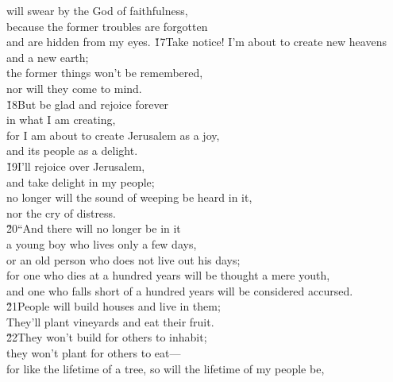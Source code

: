\begin{poetry}
\poemlll       will swear by the God of faithfulness, \\
\poeml because the former troubles are forgotten \\
\poemll    and are hidden from my eyes.
\poeml \v{17}Take notice! I'm about to create new heavens \\
\poemll    and a new earth; \\
\poeml the former things won't be remembered, \\
\poemll    nor will they come to mind. \\
\poeml \v{18}But be glad and rejoice forever \\
\poemll    in what I am creating, \\
\poeml for I am about to create Jerusalem as a joy, \\
\poemll    and its people as a delight. \\
\poeml \v{19}I'll rejoice over Jerusalem, \\
\poemll    and take delight in my people; \\
\poeml no longer will the sound of weeping be heard in it, \\
\poemll    nor the cry of distress. \\
\poeml \v{20}``And there will no longer be in it \\
\poemll    a young boy who lives only a few days, \\
\poemlll       or an old person who does not live out his days; \\
\poeml for one who dies at a hundred years will be thought a mere youth, \\
\poemll    and one who falls short of a hundred years will be considered accursed. \\
\poeml \v{21}People will build houses and live in them; \\
\poemll    They'll plant vineyards and eat their fruit. \\
\poeml \v{22}They won't build for others to inhabit; \\
\poemll    they won't plant for others to eat--- \\
\poeml for like the lifetime of a tree, so will the lifetime of my people be, \\

\end{poetry}

